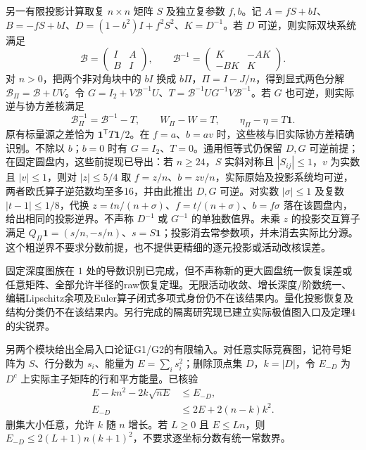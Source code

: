 \documentclass[UTF8,11pt,fontset=fandol]{ctexart}
\begin{document}
另一有限投影计算取复 $n\times n$ 矩阵 $S$ 及独立复参数 $f,b$。记 $A=fS+bI$、$B=-fS+bI$、$D=(1-b^2)I+f^2S^2$、$K=D^{-1}$。若 $D$ 可逆，则实际双块系统满足
\[
 \mathcal B=\begin{pmatrix}I&A\\B&I\end{pmatrix},\qquad
 \mathcal B^{-1}=\begin{pmatrix}K&-AK\\-BK&K\end{pmatrix}.
\]
对 $n>0$，把两个非对角块中的 $bI$ 换成 $b\Pi$，$\Pi=I-J/n$，得到显式两色分解 $\mathcal B_\Pi=\mathcal B+UV$。令 $G=I_2+V\mathcal B^{-1}U$、$T=\mathcal B^{-1}UG^{-1}V\mathcal B^{-1}$。若 $G$ 也可逆，则实际逆与协方差核满足
\[
 \mathcal B_\Pi^{-1}=\mathcal B^{-1}-T,\qquad
 W_\Pi-W=T,\qquad \eta_\Pi-\eta=T\mathbf1.
\]
原有标量源之差恰为 $\mathbf1^{\mathsf T}T\mathbf1/2$。在 $f=a$、$b=av$ 时，这些核与旧实际协方差精确识别。不除以 $b$；$b=0$ 时有 $G=I_2$、$T=0$。通用恒等式仍保留 $D,G$ 可逆前提；在固定圆盘内，这些前提现已导出：若 $n\ge24$，$S$ 实斜对称且 $|S_{ij}|\le1$，$v$ 为实数且 $|v|\le1$，则对 $|z|\le5/4$ 取 $f=z/n$、$b=zv/n$，实际原始及投影系统均可逆，两者欧氏算子逆范数均至多16，并由此推出 $D,G$ 可逆。对实数 $|\sigma|\le1$ 及复数 $|t-1|\le1/8$，代换 $z=tn/(n+\sigma)$、$f=t/(n+\sigma)$、$b=f\sigma$ 落在该圆盘内，给出相同的投影逆界。不声称 $D^{-1}$ 或 $G^{-1}$ 的单独数值界。未乘 $z$ 的投影交互算子满足 $Q_\Pi\mathbf1=(s/n,-s/n)$、$s=S\mathbf1$；投影消去常参数项，并未消去实际比分源。这个粗逆界不要求分数前提，也不提供更精细的逐元投影或活动改核误差。

固定深度图族在 $1$ 处的导数识别已完成，但不声称新的更大圆盘统一恢复误差或任意矩阵、全部允许半径的raw恢复定理。无限活动收敛、增长深度/阶数统一、编辑Lipschitz余项及Euler算子闭式多项式身份仍不在该结果内。量化投影恢复及结构分类仍不在该结果内。另行完成的隔离研究现已建立实际极值图入口及定理4的尖锐界。

另两个模块给出全局入口论证G1/G2的有限输入。对任意实际竞赛图，记符号矩阵为 $S$、行分数为 $s_i$、能量为 $E=\sum_i s_i^2$；删除顶点集 $D$，$k=|D|$，令 $E_{-D}$ 为 $D^c$ 上实际主子矩阵的行和平方能量。已核验
\[
 \begin{aligned}
 E-kn^2-2k\sqrt{nE}&\le E_{-D},\\
 E_{-D}&\le2E+2(n-k)k^2.
 \end{aligned}
\]
删集大小任意，允许 $k$ 随 $n$ 增长。若 $L\ge0$ 且 $E\le Ln$，则 $E_{-D}\le2(L+1)n(k+1)^2$，不要求逐坐标分数有统一常数界。
\end{document}
